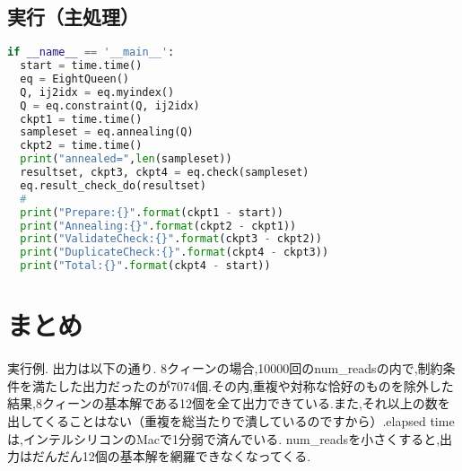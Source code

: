 \documentclass[uplatex,dvipdfmx,a4paper,11pt,oneside,openany]{jsbook}
\begin{document}
\subsection{実行（主処理）}

\begin{lstlisting}[language=Python]
if __name__ == '__main__':
  start = time.time()
  eq = EightQueen()
  Q, ij2idx = eq.myindex()
  Q = eq.constraint(Q, ij2idx)
  ckpt1 = time.time()
  sampleset = eq.annealing(Q)
  ckpt2 = time.time()
  print("annealed=",len(sampleset))
  resultset, ckpt3, ckpt4 = eq.check(sampleset)
  eq.result_check_do(resultset)
  #
  print("Prepare:{}".format(ckpt1 - start))
  print("Annealing:{}".format(ckpt2 - ckpt1))
  print("ValidateCheck:{}".format(ckpt3 - ckpt2))
  print("DuplicateCheck:{}".format(ckpt4 - ckpt3))
  print("Total:{}".format(ckpt4 - start))
\end{lstlisting}

\section{まとめ}

実行例. 出力は以下の通り.
8クィーンの場合,10000回のnum\_readsの内で,制約条件を満たした出力だったのが7074個.その内,重複や対称な恰好のものを除外した結果,8クィーンの基本解である12個を全て出力できている.また,それ以上の数を出してくることはない（重複を総当たりで潰しているのですから）.elapsed timeは,インテルシリコンのMacで1分弱で済んでいる.
num\_readsを小さくすると,出力はだんだん12個の基本解を網羅できなくなってくる.
\end{document}
